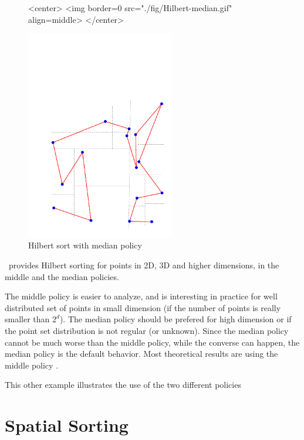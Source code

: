 \begin{figure}[t]
\begin{ccHtmlOnly}
<center>
<img border=0 src="./fig/Hilbert-median.gif" align=middle>
</center>
\end{ccHtmlOnly} 
\begin{ccTexOnly}
\begin{center}
\includegraphics[width=6.5cm]{Spatial_sorting/fig/Hilbert-median}
\end{center}
\end{ccTexOnly}
\caption{Hilbert sort with median policy
\label{Spatial_sorting_fig_Hilbert_median}}
\end{figure}


\cgal\ provides Hilbert sorting for points in 2D, 3D and higher dimensions,
in the middle and the median policies.

The middle policy is easier to analyze, and is interesting in practice
for well distributed set of points in small dimension (if the number
of points is really smaller than $2^d$).
The median policy should be prefered for high dimension or if 
the point set distribution is not regular (or unknown).
Since the median policy cannot be much worse than the middle
policy, while the converse can happen, the median policy is the
default behavior.
Most theoretical results are using the middle policy
\cite{acr-icb-03,b-aahsf-71,bg-sfche-89,pb-scpts-89}.


This other example illustrates the use of the two different policies




\section{Spatial Sorting\label{sec:spatial_sorting}}

